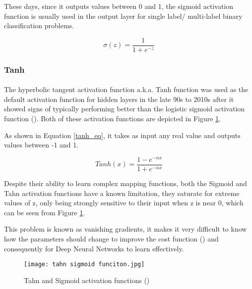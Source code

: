 These days, since it outputs values between 0 and 1, the sigmoid activation function is usually used in the output layer for single label/ multi-label binary classification problems. 

\begin{equation}
    \label{sigmoid_eq}
    \sigma(z) = \frac{1} {1 + e^{-z}}
\end{equation}


\subsubsection{Tanh}
\paragraph{}
The hyperbolic tangent activation function \gls{a.k.a.} Tanh function was used as the default activation function for hidden layers in the late 90s to 2010s after it showed signs of typically performing better than the logistic sigmoid activation function (\cite{GoodBengCour16}).
Both of these activation functions are depicted in Figure \ref{fig_tahn_sigmoid}.

As shown in Equation \ref{tanh_eq}, it takes as input any real value and outputs values between -1 and 1.

\begin{equation}
    \label{tanh_eq}
    Tanh(x) = \frac{1 - e^{-\alpha x}}{1 + e^{-\alpha x}} 
\end{equation}

Despite their ability to learn complex mapping functions, both the Sigmoid and Tahn activation functions have a known limitation, they saturate for extreme values of z, only being strongly sensitive to their input when z is near 0, which can be seen from Figure \ref{fig_tahn_sigmoid}. 

This problem is known as vanishing gradients, it makes it very difficult to know how the parameters should change to improve the cost function (\cite{GoodBengCour16}) and consequently for Deep Neural Networks to learn effectively.

\begin{figure}[hbt!]
    \centering
    \texttt{[image: tahn sigmoid funciton.jpg]}
    \caption{Tahn and Sigmoid activation functions (\cite{tahnfunc})}
    \label{fig_tahn_sigmoid}

\end{figure}

